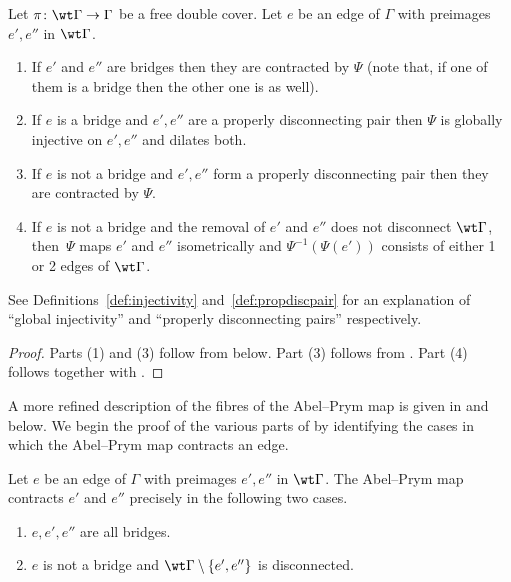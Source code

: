 \begin{theorem}\label{thm:behaviousOnEdges}
  Let $\pi\colon\wt\Gamma\to\Gamma$ be a free double cover. Let $e$ be an edge of $\Gamma$ with preimages $e',e''$ in $\wt\Gamma$.

  \begin{enumerate}
      \item If $e'$ and $e''$ are bridges then they are contracted by $\Psi$ (note that, if one of them is a bridge then the other one is as well). 

            \item If $e$ is a bridge and $e',e''$ are a properly disconnecting pair then              
             $\Psi$ is globally injective 
             on $e',e''$  
            and dilates both.

           \item If $e$ is not a bridge and $e',e''$ form  a properly disconnecting pair  then they are contracted by $\Psi$.   
      
\item If $e$ is not a bridge and the removal of $e'$ and $e''$ does not disconnect $\wt\Gamma$,  then~$\Psi$ maps $e'$ and $e''$ isometrically and  $\Psi^{-1}(\Psi(e'))$ consists of either 1 or 2 edges of $\wt\Gamma$. 
      
  \end{enumerate}
\end{theorem}

\noindent See Definitions~\ref{def:injectivity}  and~\ref{def:propdiscpair} for an explanation of ``global injectivity'' and ``properly disconnecting pairs'' respectively. 


\begin{proof}
Parts (1) and (3) follow from  below.  Part (3) follows from .
Part (4) follows  together with .  
\end{proof}

A more refined description of the fibres of the Abel--Prym map is given in   and 
below. 
We begin the proof of the various parts of  by identifying the cases  in which the Abel--Prym map contracts an edge.

\begin{lemma}\label{lem:contractedEdges}
    Let $e$ be an edge of $\Gamma$ with preimages $e',e''$ in $\wt\Gamma$. The Abel--Prym map contracts $e'$ and $e''$ precisely in the following two cases. 
    \begin{enumerate}
        \item $e,e',e''$ are all bridges.
        
        \item $e$ is not a bridge and $\wt\Gamma\setminus\{e',e''\}$ is disconnected. 
    \end{enumerate}
\end{lemma}

